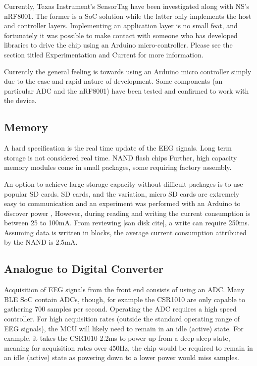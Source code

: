\documentclass[]{article}
\begin{document}
Currently, Texas Instrument's SensorTag have been investigated along with \ac{NS}'s nRF8001. The former is a \ac{SoC} solution while the latter only implements the host and controller layers. Implementing an application layer is no small feat, and fortunately it was possible to make contact with someone who has developed libraries to drive the chip using an Arduino micro-controller. Please see the section titled Experimentation and Current  for more information.

Currently the general feeling is towards using an Arduino micro controller simply due to the ease and rapid nature of development. Some components (an particular ADC and the nRF8001) have been tested and confirmed to work with the device.

\subsection{Memory}

 A hard specification is the real time update of the \ac{EEG} signals. Long term storage is not considered real time. NAND flash chips  Further, high capacity memory modules come in small packages, some requiring factory assembly. 

An option to achieve large storage capacity without difficult packages is to use popular SD cards. SD cards, and the variation, micro SD cards are extremely easy to communication and an experiment was performed with an Arduino to discover power , However, during reading and writing the current consumption is between 25 to 100mA. From reviewing [san disk cite], a write can require 250ms. Assuming data is written in blocks, the average current consumption attributed by the NAND is 2.5mA. 



\subsection{Analogue to Digital Converter}

Acquisition of \ac{EEG} signals from the front end consists of using an \ac{ADC}. Many \ac{BLE} \ac{SoC} contain \ac{ADC}s, though, for example the CSR1010 are only capable to gathering 700 samples per second. Operating the \ac{ADC} requires a high speed controller. For high acquisition rates (outside the standard operating range of \ac{EEG} signals), the \ac{MCU} will likely need to remain in an idle (active) state. For example, it takes the CSR1010 2.2ms to power up from a deep sleep state, meaning for acquisition rates over 450Hz, the chip would be required to remain in an idle (active) state as powering down to a lower power would miss samples. 
\end{document}
